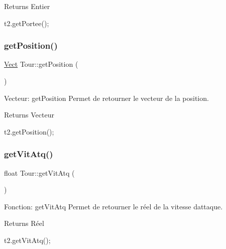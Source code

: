 \begin{DoxyReturn}{Returns}
Entier 
\begin{DoxyCode}
t2.getPortee();
\end{DoxyCode}
 
\end{DoxyReturn}
\mbox{\label{classTour_a2283f61d6b088bf41c53c882f4a72864}} 
\subsubsection{\texorpdfstring{get\+Position()}{getPosition()}}
{\footnotesize\ttfamily \hyperlink{classVect}{Vect} Tour\+::get\+Position (\begin{DoxyParamCaption}{ }\end{DoxyParamCaption})}



Vecteur\+: get\+Position Permet de retourner le vecteur de la position. 

\begin{DoxyReturn}{Returns}
Vecteur 
\begin{DoxyCode}
t2.getPosition();
\end{DoxyCode}
 
\end{DoxyReturn}
\mbox{\label{classTour_a41fc157f749f571732100fa0daa1ad25}} 
\subsubsection{\texorpdfstring{get\+Vit\+Atq()}{getVitAtq()}}
{\footnotesize\ttfamily float Tour\+::get\+Vit\+Atq (\begin{DoxyParamCaption}{ }\end{DoxyParamCaption})}



Fonction\+: get\+Vit\+Atq Permet de retourner le réel de la vitesse d\textquotesingle{}attaque. 

\begin{DoxyReturn}{Returns}
Réel 
\begin{DoxyCode}
t2.getVitAtq();
\end{DoxyCode}
 
\end{DoxyReturn}
\mbox{\label{classTour_a7f9a17a8138ebd8afe72520d7d8a18db}} 
